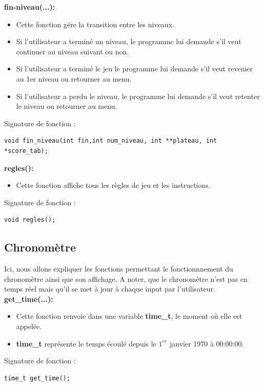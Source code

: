 \documentclass{article}
\begin{document}
\textbf{fin-niveau(...):}
\begin{itemize}
\item Cette fonction gére la transition entre les niveaux.
\item Si l'utilisateur a terminé un niveau, le programme lui demande s'il veut continuer au niveau suivant ou non.
\item Si l'utilisateur a terminé le jeu le programme lui demande s'il veut revenier au 1er niveau ou retourner au menu.
\item Si l'utilisateur a perdu le niveau, le programme lui demande s'il veut retenter le niveau ou retourner au menu.
\end{itemize}
Signature de fonction :
\begin{lstlisting}
void fin_niveau(int fin,int num_niveau, int **plateau, int *score_tab);
\end{lstlisting}
\textbf{regles():}
\begin{itemize}
\item Cette fonction affiche tous les règles de jeu et les instructions.
\end{itemize}
Signature de fonction :
\begin{lstlisting}
void regles();
\end{lstlisting}
\newpage

\subsection{Chronomètre}
Ici, nous allons expliquer les fonctions permettant le fonctionnnement du chronomètre ainsi que son affichage.
A noter, que le chronomètre n'est pas en temps réel mais qu'il se met à jour à chaque input par l'utilisateur.\\

\textbf{get\_time(...):}
\begin{itemize}
\item Cette fonction renvoie dans une variable \textbf{time\_t}, le moment où elle est appelée.
\item \textbf{time\_t} représente le temps écoulé depuis le $1^{er}$ janvier 1970 à 00:00:00.
\end{itemize}
Signature de fonction :
\begin{lstlisting}
time_t get_time();
\end{lstlisting}
\end{document}
